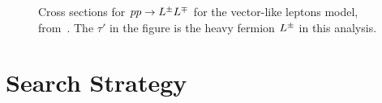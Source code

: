 \begin{figure}[h]
  \centering
  \caption{Cross sections for $pp\rightarrow L^{\pm}L^{\mp}$ for the vector-like leptons model, from~\cite{Martin:2012dg}. The $\tau'$ in the figure is the heavy fermion $L^{\pm}$ in this analysis.}
  \label{fig:vll-xsec}
\end{figure}

\section{Search Strategy}
